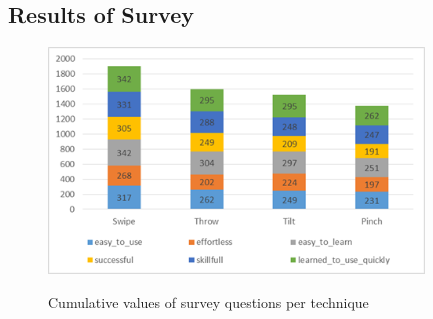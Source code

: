 \subsection{Results of Survey}

\begin{figure}[H]
	{\includegraphics[width = 1\columnwidth , height = 6cm ]{images/survey-data.png}} 
	\caption{
		Cumulative values of survey questions per technique
	}
	\label{fig:allSetup}
\end{figure}